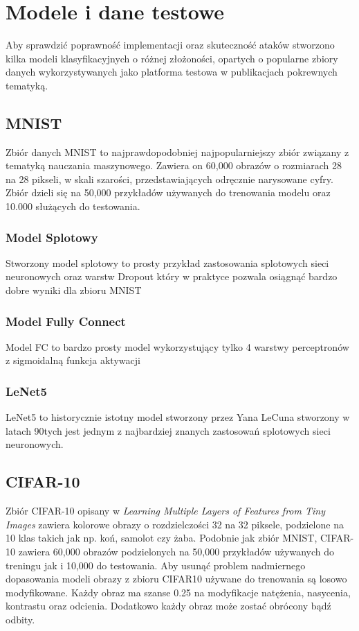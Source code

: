 \documentclass[
    left=2.5cm,         %
    right=2.5cm,        %
    top=2.5cm,          %
    bottom=3cm,         %
    bindingoffset=6mm,  %
    nohyphenation=false %
]{eiti/eiti-thesis}
\begin{document}
\section{Modele i dane testowe}
Aby sprawdzić poprawność implementacji oraz skuteczność ataków stworzono
kilka modeli klasyfikacyjnych o różnej złożoności, opartych o popularne zbiory danych
wykorzystywanych jako platforma testowa w publikacjach pokrewnych tematyką.

    \subsection{MNIST}
    Zbiór danych MNIST \cite{mnist} to najprawdopodobniej najpopularniejszy zbiór związany z
    tematyką nauczania maszynowego.
    Zawiera on 60,000 obrazów o rozmiarach 28 na 28 pikseli, w skali szarości, przedstawiających
    odręcznie narysowane cyfry. Zbiór dzieli się na 50,000 przykładów używanych do
    trenowania modelu oraz 10.000 służących do testowania.

        \subsubsection{Model Splotowy}
        Stworzony model splotowy to prosty przykład zastosowania splotowych sieci neuronowych oraz warstw Dropout
        który w praktyce pozwala osiągnąć bardzo dobre wyniki dla zbioru MNIST

        \subsubsection{Model Fully Connect}
        Model FC to bardzo prosty model wykorzystujący tylko 4 warstwy perceptronów z sigmoidalną funkcja aktywacji

        \subsubsection{LeNet5}
        LeNet5 to historycznie istotny model stworzony przez Yana LeCuna stworzony w latach 90tych
        jest jednym z najbardziej znanych zastosowań splotowych sieci neuronowych.

    \subsection{CIFAR-10}
    Zbiór CIFAR-10 opisany w \textit{Learning Multiple Layers of Features from Tiny Images} \cite{Krizhevsky2009LearningML} zawiera kolorowe obrazy o rozdzielczości 32 na 32 piksele,
    podzielone na 10 klas takich jak np. koń, samolot czy żaba. Podobnie jak zbiór MNIST, CIFAR-10 zawiera
    60,000 obrazów podzielonych na 50,000 przykładów używanych do treningu jak i 10,000 do testowania.
    Aby usunąć problem nadmiernego dopasowania modeli obrazy z zbioru CIFAR10 używane
    do trenowania są losowo modyfikowane. Każdy obraz ma szanse 0.25
    na modyfikacje natężenia, nasycenia, kontrastu oraz odcienia. Dodatkowo każdy obraz może zostać obrócony bądź odbity.
\end{document}
